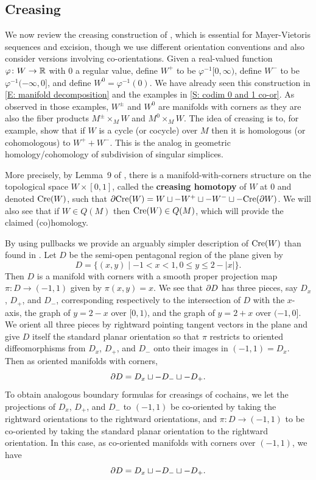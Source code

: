 \subsection{Creasing}\label{S: creasing}

We now review the creasing construction of \cite[Section 2.4]{Lipy14}, which is essential for Mayer-Vietoris sequences and excision, though we use different orientation conventions and also consider versions involving co-orientations.
Given a real-valued function $\varphi \colon W \to \mathbb{R}$ with $0$ a regular value,
define $W^+$ to be $\varphi^{-1} [0, \infty)$, define $W^-$ to be $\varphi^{-1} (-\infty, 0]$, and define $W^0 = \varphi^{-1}(0)$. We have already seen this construction in \cref{E: manifold decomposition} and the examples in \cref{S: codim 0 and 1 co-or}.
 As observed in those examples, $W^\pm$ and $W^0$
are manifolds with corners as they are also the fiber products $M^\pm \times_M W$ and $M^0 \times_M W$. The idea of creasing is to, for example, show that if $W$ is a cycle (or cocycle) over $M$ then it is homologous (or cohomologous) to $W^++W^-$. This is the analog in geometric homology/cohomology of subdivision of singular simplices.

More precisely, by Lemma~9 of \cite{Lipy14}, there is a manifold-with-corners structure on the topological space $W \times [0,1]$,
called the \textbf{creasing homotopy} of $W$ at $0$ and denoted $\mathrm{Cre}(W)$, such that $\partial \mathrm{Cre}(W) = W \sqcup -W^+ \sqcup -W^- \sqcup - \mathrm{Cre}(\partial W)$. We will also see that if $W \in Q(M)$ then $\mathrm{Cre}(W) \in Q(M)$, which will provide the claimed (co)homology.

By using pullbacks we provide an arguably simpler description of $\mathrm{Cre}(W)$ than found in \cite{Lipy14}. Let $D$ be the semi-open pentagonal region of the plane given by $$D = \{(x,y) \mid -1<x<1, 0 \leq y \leq 2-|x|\}.$$
Then $D$ is a manifold with corners with a smooth proper projection map $\pi:D \to (-1,1)$ given by $\pi(x,y) = x$. We see that $\partial D$ has three pieces, say $D_x$, $D_+$, and $D_-$, corresponding respectively to the intersection of $D$ with the $x$-axis, the graph of $y = 2-x$ over $[0,1)$, and the graph of $y = 2+x$ over $(-1, 0]$. We orient all three pieces by rightward pointing tangent vectors in the plane and give $D$ itself the standard planar orientation so that $\pi$ restricts to oriented diffeomorphisms from $D_x$, $D_+$, and $D_-$ onto their images in $(-1,1) = D_x$. Then as oriented manifolds with corners, $$\partial D = D_x \sqcup -D_- \sqcup -D_+.$$
To obtain analogous boundary formulas for creasings of cochains, we let the projections of $D_x$, $D_+$, and $D_-$ to $(-1,1)$ be co-oriented by taking the rightward orientations to the rightward orientations, and $\pi:D \to (-1,1)$ to be co-oriented by taking the standard planar orientation to the rightward orientation. In this case, as co-oriented manifolds with corners over $(-1,1)$, we have
 $$\partial D = D_x \sqcup -D_- \sqcup -D_+.$$

